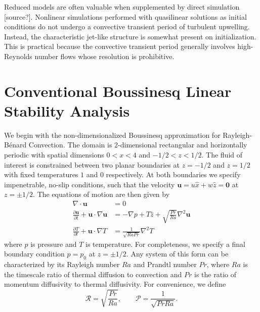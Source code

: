 \documentclass[reprint,amsmath,amssymb,aps]{revtex4-1}
\begin{document}
Reduced models are often valuable when supplemented by direct simulation [source?]. 
Nonlinear simulations performed with quasilinear solutions as initial conditions do not undergo a convective transient period of turbulent upwelling. 
Instead, the characteristic jet-like structure is somewhat present on initialization. 
This is practical because the convective transient period generally involves high-Reynolds number flows whose resolution is prohibitive. 

\section{Conventional Boussinesq Linear Stability Analysis}\label{sec:boussinesq}
We begin with the non-dimensionalized Boussinesq approximation for Rayleigh-Bénard Convection. 
The domain is 2-dimensional rectangular and horizontally periodic with spatial dimensions $0 < x < 4$ and $-1/2 < z < 1/2$. 
The fluid of interest is constrained between two planar boundaries at $z = -1/2$ and $z = 1/2$ with fixed temperatures $1$ and $0$ respectively. 
At both boundaries we specify impenetrable, no-slip conditions, such that the velocity $\mathbf{u} = u \hat{x} + w \hat{z} = \mathbf{0}$ at $z = \pm 1/2$. 
The equations of motion are then given by
\begin{align}
    \nabla \cdot \mathbf{u} &= 0 \label{EQ:motion1}\\
    \frac{\partial \mathbf{u}}{\partial t} + \mathbf{u} \cdot \nabla \mathbf{u} &= - \nabla p + T \hat{z} + \sqrt{\frac{Pr}{Ra}} \nabla^2 \mathbf{u} \label{EQ:motion2}\\
    \frac{\partial T}{\partial t} + \mathbf{u} \cdot \nabla T &= \frac{1}{\sqrt{RaPr}} \nabla^2 T \label{EQ:motion3}
\end{align}
where $p$ is pressure and $T$ is temperature. 
For completeness, we specify a final boundary condition $p = p_0$ at $z = \pm 1/2$. 
Any system of this form can be characterized by its Rayleigh number $Ra$ and Prandtl number $Pr$, where $Ra$ is the timescale ratio of thermal diffusion to convection and $Pr$ is the ratio of momentum diffusivity to thermal diffusivity.  
For convenience, we define 
\begin{equation}
\mathcal{R} = \sqrt{\frac{Pr}{Ra}}, \qquad \mathcal{P} = \frac{1}{\sqrt{Pr Ra}}.
\end{equation}
\end{document}
